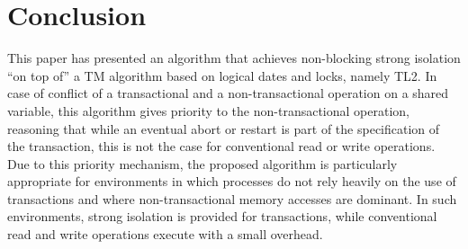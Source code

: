 \documentclass[11pt,letterpaper]{article}
\newcommand{\Xomit}[1]{}
\begin{document}

\section{Conclusion}
\label{sec:conclusions}
This paper has presented an algorithm that achieves non-blocking strong 
isolation  ``on top of'' a TM algorithm based on logical dates and locks, 
namely  TL2. 
In case of conflict of a transactional and a non-transactional
operation on a shared variable, this algorithm gives priority to 
the non-transactional operation, 
reasoning that while an eventual abort or restart is part of the 
specification of the transaction,
this is not the case for conventional read or write operations. 
Due to this priority mechanism, 
the proposed algorithm is   particularly appropriate  for environments 
in which processes do not rely heavily
on the use of transactions and where non-transactional memory 
accesses are dominant. In 
such environments, strong isolation is  provided for transactions, 
while conventional read and write operations execute with a small overhead.


\Xomit{%
In order to implement this priority mechanism, 
the algorithm will often preemptively abort transactions 
on the sole suspicion that they might violate consistency, 
even though those transactions might have 
turned out to be acceptable. This results in an algorithm that 
is not permissive, in the intuitive sense of 
permissiveness \cite{Guerraoui:2008:PTM:1432291.1432313}. 
Future work would focus on creating 
a more permissive version of the algorithm as well as on 
examining the application of some of the 
algorithm principles to non-blocking TM algorithms in order 
to equip them with mechanisms that provide strong isolation.
}  %



%
%
\end{document}
